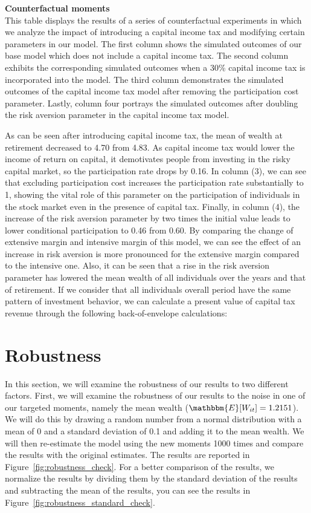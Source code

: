 \documentclass[13pt]{article}
\begin{document}
\begin{table}[!htbp]
    \centering
    \caption{\textbf{Counterfactual moments}\\
    \small{
   This table displays the results of a series of counterfactual experiments in which we analyze the impact of introducing a capital income tax and modifying certain parameters in our model. The first column shows the simulated outcomes of our base model which does not include a capital income tax. The second column exhibits the corresponding simulated outcomes when a 30\% capital income tax is incorporated into the model. The third column demonstrates the simulated outcomes of the capital income tax model after removing the participation cost parameter. Lastly, column four portrays the simulated outcomes after doubling the risk aversion parameter in the capital income tax model.
    }
    }
    \label{tab:counter_moments}
    
\end{table}
As can be seen after introducing capital income tax, the mean of wealth at retirement decreased to 4.70 from 4.83. As capital income tax would lower the income of return on capital, it demotivates people from investing in the risky capital market, so the participation rate drops by 0.16. In column (3), we can see that excluding participation cost increases the participation rate substantially to 1, showing the vital role of this parameter on the participation of individuals in the stock market even in the presence of capital tax. Finally, in column (4), the increase of the risk aversion parameter by two times the initial value leads to lower conditional participation to 0.46 from 0.60. By comparing the change of extensive margin and intensive margin of this model, we can see the effect of an increase in risk aversion is more pronounced for the extensive margin compared to the intensive one. Also, it can be seen that a rise in the risk aversion parameter has lowered the mean wealth of all individuals over the years and that of retirement. If we consider that all individuals overall period have the same pattern of investment behavior, we can calculate a present value of capital tax revenue through the following back-of-envelope calculations:
\section{Robustness}
In this section, we will examine the robustness of our results to two different factors. 
First, we will examine the robustness of our results to the noise in one of our targeted moments, namely the mean wealth ($\mathbbm{E}[W_{it}] = 1.2151$). We will do this by drawing a random number from a normal distribution with a mean of 0 and a standard deviation of 0.1 and adding it to the mean wealth. We will then re-estimate the model using the new moments 1000 times and compare the results with the original estimates. The results are reported in Figure~\ref{fig:robustness_check}. 
For a better comparison of the results, we normalize the results by dividing them by the standard deviation of the results and subtracting the mean of the results, you can see the results in Figure~\ref{fig:robustness_standard_check}.
\end{document}

